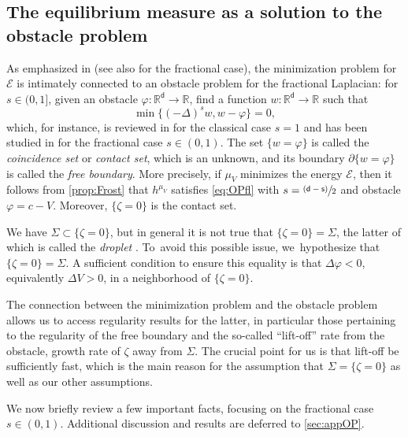 \documentclass[JEP,XML,SOM,Unicode,published]{cedram}
\newcommand{\psfrac}[2]{\sfrac{(#1)}{#2}}
\theoremstyle{plain}
\theoremstyle{definition}
\newcommand{\R}{{\mathbb{R}}}
\newcommand{\Ec}{\mathcal{E}}
\let\D\Delta
\let\p\partial
\renewcommand{\d}{\mathsf{d}}
\newcommand{\s}{\mathsf{s}}
\begin{document}
\subsection{The equilibrium measure as a solution to the obstacle problem}\label{ssec:EMOPop}

As {emphasized} in \cite[\S 2.5]{Serfaty2015CGL} (see also \cite{PS2017,CDM2016} for the fractional case), the minimization problem for $\Ec$ is intimately connected to an obstacle problem for the fractional Laplacian: for $s\in (0,1]$, given an obstacle $\varphi:\R^\d\to\R$, find a function $w:\R^\d\to\R$ such that
\begin{equation}\label{eq:OPfl}
\min\{(-\D)^{s}w, w-\varphi\} = 0,
\end{equation}
which, for instance, is reviewed in \cite{Caffarelli1998} for the classical case $s=1$ and has been studied in \cite{Silvestre2007,ACS2008, CSS2008, KPS2015, DsS2016, BFRo2018, JN2017, KRS2019} for the fractional case $s \in (0,1)$. The set $\{w=\varphi\}$ is called the \emph{coincidence set} or \emph{contact set}, which is an unknown, and its boundary $\p\{w=\varphi\}$ is called the \emph{free boundary}. More precisely, if $\mu_V$ minimizes the energy $\Ec$, then it follows from \cref{prop:Frost} that $h^{\mu_V}$ satisfies \eqref{eq:OPfl} with $s = \psfrac{\d-\s}{2}$ and obstacle $\varphi = c-V$. Moreover, $\{\zeta=0\}$ is the contact set.

{We have $\Sigma \subset \{\zeta=0\}$}, but in general it is not true that $\{\zeta=0\} =\Sigma$, the latter of which is called the \emph{droplet} \cite{HM2013}. To~avoid this possible issue, we~hypothesize that $\{\zeta=0\}=\Sigma$. A sufficient condition to ensure this equality is that $\D\varphi <0$, equivalently $\D V>0$, in a neighborhood of $\{\zeta=0\}$.

The connection between the minimization problem and the obstacle problem allows us to access regularity results for the latter, in particular those pertaining to the regularity of the free boundary {and the so-called ``lift-off'' rate from the obstacle, \ie growth rate of $\zeta$ away from $\Sigma$. The crucial point for us is that lift-off be sufficiently fast, which is the main reason for the assumption that $\Sigma= \{\zeta=0\}$ as well as our other assumptions.}

We now briefly review a few important facts, focusing on the fractional case $s \in (0,1)$. Additional discussion and results are deferred to \cref{sec:appOP}.
\end{document}

